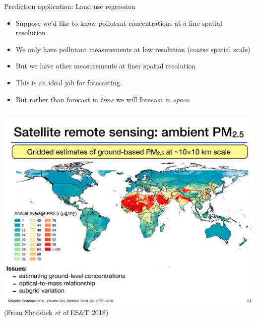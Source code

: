 \documentclass[aspectratio=169, handout]{beamer}
\begin{document}
\begin{frame}{Prediction application: Land use regression}
  \begin{itemize}
    \item Suppose we'd like to know pollutant concentrations at a fine spatial resolution
    \item We only have pollutant measurements at low resolution (coarse spatial scale)
    \item But we have other measurements at finer spatial resolution
    \item This is an ideal job for forecasting.  
    \item But rather than forecast in \textit{time} we will forecast in \textit{space}.
  \end{itemize}

\begin{columns}
\includegraphics[width = \textwidth]{pm2_5_LUR_Shaddick.pdf}
(From Shaddick \textit{et al} ES\&T 2018)
\end{columns}
\end{frame}
\end{document}
